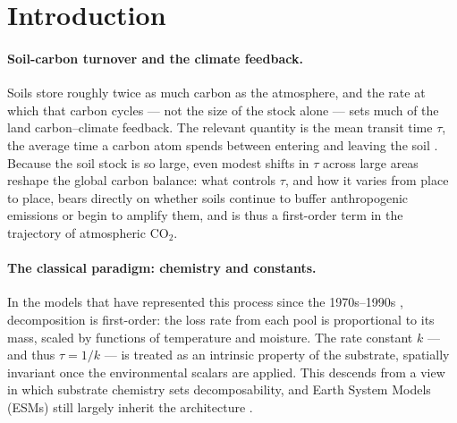 
\section{Introduction}
\label{sec:intro}

\paragraph{Soil-carbon turnover and the climate feedback.}
Soils store roughly twice as much carbon as the atmosphere, and the rate at which
that carbon cycles --- not the size of the stock alone --- sets much of the land
carbon--climate feedback. The relevant quantity is the mean transit time $\tau$,
the average time a carbon atom spends between entering and leaving the soil
\citep{Sierra2017,Sierra2018}. Because the soil stock is so large, even modest
shifts in $\tau$ across large areas reshape the global carbon balance: what
controls $\tau$, and how it varies from place to place, bears directly on whether
soils continue to buffer anthropogenic emissions or begin to amplify them, and is
thus a first-order term in the trajectory of atmospheric CO$_2$.

\paragraph{The classical paradigm: chemistry and constants.}
In the models that have represented this process since the 1970s--1990s
, decomposition is first-order: the loss rate from each pool is proportional to
its mass, scaled by functions of temperature and moisture. The rate constant $k$
--- and thus $\tau = 1/k$ --- is treated as an intrinsic property of the
substrate, spatially invariant once the environmental scalars are applied. This
descends from a view in which substrate chemistry sets decomposability, and Earth
System Models (ESMs) still largely inherit the architecture
.

